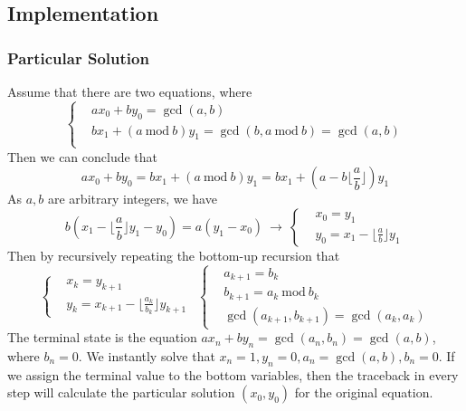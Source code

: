 \documentclass[11pt]{article}
\begin{document}
\subsection{Implementation}
\subsubsection{Particular Solution}
Assume that there are two equations, where
\begin{equation}
\left\{
\begin{aligned}
    &ax_0 + by_0 = \gcd(a, b) \\
    &bx_1 + (a~\text{mod}~b)y_1 = \gcd(b, a~\text{mod}~b) = \gcd(a, b)\\
\end{aligned}
\right.
\end{equation}
Then we can conclude that 
\begin{equation}
    ax_0 + by_0 = bx_1 + (a~\text{mod}~b)y_1 = bx_1 + (a - b\lfloor \frac{a}{b} \rfloor )y_1
\end{equation}
As $a, b$ are arbitrary integers, we have
\begin{equation}
    b(x_1 - \lfloor \frac{a}{b} \rfloor y_1 - y_0) = a(y_1 - x_0)~\rightarrow~\left\{ \begin{aligned}
        &x_0 = y_1 \\ &y_0 = x_1 - \lfloor \frac{a}{b} \rfloor y_1
    \end{aligned} \right.
\end{equation}
Then by recursively repeating the bottom-up recursion that
\begin{equation}
    \left\{ \begin{aligned}
        &x_{k} = y_{k+1} \\ &y_{k} = x_{k+1} - \lfloor \frac{a_k}{b_k} \rfloor y_{k+1} \end{aligned}
    \right.~~\left\{ \begin{aligned}&a_{k+1} = b_{k} \\ &b_{k+1} = a_k~\text{mod}~b_k   \\ &\gcd(a_{k+1}, b_{k+1}) = \gcd(a_{k}, a_{k}) \end{aligned} \right.
\end{equation}
The terminal state is the equation $ax_n + by_n = \gcd(a_n, b_n) = \gcd(a, b)$, where $b_n = 0$. We instantly solve that $x_n = 1, y_n = 0, a_n = \gcd(a, b), b_n = 0$. If we assign the terminal value to the bottom variables, then the traceback in every step will calculate the particular solution $(x_0, y_0)$ for the original equation. 
\end{document}
